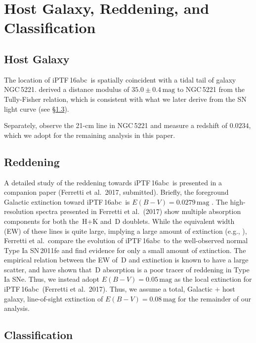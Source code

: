 \documentclass[twocolumn]{aastex61}
\newcommand{\abc}{iPTF\,16abc}
\begin{document}
\section{Host Galaxy, Reddening, and Classification}
\label{sec:usual_staff}

\subsection{Host Galaxy}
\label{sec:host}

The location of \abc\ is spatially coincident with a tidal tail of
galaxy NGC\,5221. \citet{2007A&A...465...71T} derived a distance
modulus of $35.0\pm0.4\,\textrm{mag}$ to NGC\,5221 from the 
Tully-Fisher relation, which is consistent with what we later derive from the SN light curve (see \S\ref{sec:classification}).

Separately, \citet{2015MNRAS.447.1531C} observe the 21-cm line in
NGC\,5221 and measure a redshift of $0.0234$, which we adopt for the remaining analysis in this paper.

\subsection{Reddening}
\label{sec:reddening}

A detailed study of the reddening towards \abc\ is presented in a 
companion paper (Ferretti et al.\ 2017, submitted). Briefly, the 
foreground Galactic extinction toward \abc\
is $E(B-V) = 0.0279 \, \mathrm{mag}$ \citep{2011ApJ...737..103S}. The high-resolution spectra presented in Ferretti et al.\ (2017) show multiple absorption components for both the \,H$+$K and \,D doublets. While the equivalent width (EW) of these lines is quite large, implying a large amount of extinction (e.g., \citealt{2012MNRAS.426.1465P}), Ferretti et al.\ compare the evolution of \abc\ to the well-observed normal Type Ia SN\,2011fe and find evidence for only a small amount of extinction. The empirical relation between the EW of \,D and extinction is known to have a large scatter, and \citet{2013ApJ...779...38P} have shown that \,D absorption is a poor tracer of reddening in Type Ia SNe. Thus, we instead adopt $E(B-V) = 0.05 \, \mathrm{mag}$ as the local extinction for \abc\ (Ferretti et al.\ 2017). Thus, we assume a total, Galactic $+$ host galaxy, line-of-sight extinction of $E(B-V) = 0.08 \, \mathrm{mag}$ for the remainder of our analysis.

\subsection{Classification}
\label{sec:classification}
\end{document}

